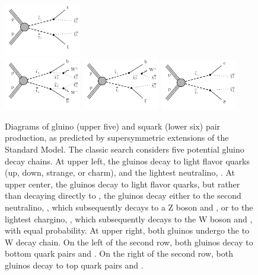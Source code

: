 \begin{figure}[h!]
    \includegraphics[width=0.3\textwidth]{figures/MT2_2019/Figure_007-h} \\
    \includegraphics[width=0.3\textwidth]{figures/MT2_2019/Figure_007-i}
    \includegraphics[width=0.3\textwidth]{figures/MT2_2019/Figure_007-j}
    \includegraphics[width=0.3\textwidth]{figures/MT2_2019/Figure_007-k} \\
    \caption[Diagrams for gluino and squark pair production, as predicted by supersymmetric extensions of the Standard Model.]{Diagrams of gluino (upper five) and squark (lower six) pair production, as predicted by supersymmetric extensions of the Standard Model. 
The classic search considers five potential gluino decay chains. 
At upper left, the gluinos decay to light flavor quarks (up, down, strange, or charm), and the lightest neutralino, \lsp.
At upper center, the gluinos decay to light flavor quarks, but rather than decaying directly to \lsp, the gluinos decay either to the second neutralino, \chitwo, which subsequently decays to a Z boson and \lsp, or to the lightest chargino, \chargino, which subsequently decays to the W boson and \lsp, with equal probability.
At upper right, both gluinos undergo the \chargino to W decay chain.
On the left of the second row, both gluinos decay to bottom quark pairs and \lsp.
On the right of the second row, both gluinos decay to top quark pairs and \lsp.
}
\end{figure}

